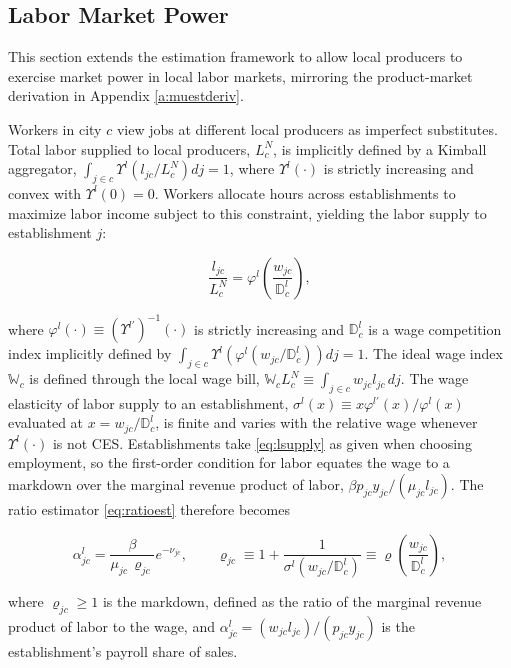 \subsection{Labor Market Power}\label{a:muestlmp}
This section extends the estimation framework to allow local producers to exercise market power in local labor markets, mirroring the product-market derivation in Appendix \ref{a:muestderiv}.

Workers in city $c$ view jobs at different local producers as imperfect substitutes. Total labor supplied to local producers, $L^N_c$, is implicitly defined by a Kimball aggregator, $\int_{j \in c} \Upsilon^l\left(l_{jc}/L^N_c\right) dj = 1$, where $\Upsilon^l(\cdot)$ is strictly increasing and convex with $\Upsilon^l(0) = 0$. Workers allocate hours across establishments to maximize labor income subject to this constraint, yielding the labor supply to establishment $j$:

\begin{equation}\label{eq:lsupply}
\frac{l_{jc}}{L^N_c} = \varphi^l\left(\frac{w_{jc}}{\mathbb{D}^l_c}\right),
\end{equation}

where $\varphi^l(\cdot) \equiv \left(\Upsilon^{l\prime}\right)^{-1}(\cdot)$ is strictly increasing and $\mathbb{D}^l_c$ is a wage competition index implicitly defined by $\int_{j \in c} \Upsilon^l\left(\varphi^l\left(w_{jc}/\mathbb{D}^l_c\right)\right) dj = 1$. The ideal wage index $\mathbb{W}_c$ is defined through the local wage bill, $\mathbb{W}_c L^N_c \equiv \int_{j \in c} w_{jc} l_{jc} \, dj$. The wage elasticity of labor supply to an establishment, $\sigma^l(x) \equiv x \varphi^{l\prime}(x)/\varphi^l(x)$ evaluated at $x = w_{jc}/\mathbb{D}^l_c$, is finite and varies with the relative wage whenever $\Upsilon^l(\cdot)$ is not CES. Establishments take \eqref{eq:lsupply} as given when choosing employment, so the first-order condition for labor equates the wage to a markdown over the marginal revenue product of labor, $\beta p_{jc} y_{jc} / (\mu_{jc} l_{jc})$. The ratio estimator \eqref{eq:ratioest} therefore becomes

\begin{equation}\label{eq:ratioestlmp}
\alpha^l_{jc} = \frac{\beta}{\mu_{jc} \, \varrho_{jc}} e^{-\nu_{jc}}, \qquad \varrho_{jc} \equiv 1 + \frac{1}{\sigma^l\left(w_{jc}/\mathbb{D}^l_c\right)} \equiv \varrho\left(\frac{w_{jc}}{\mathbb{D}^l_c}\right),
\end{equation}

where $\varrho_{jc} \geq 1$ is the markdown, defined as the ratio of the marginal revenue product of labor to the wage, and $\alpha^l_{jc} = (w_{jc} l_{jc})/(p_{jc} y_{jc})$ is the establishment’s payroll share of sales.

